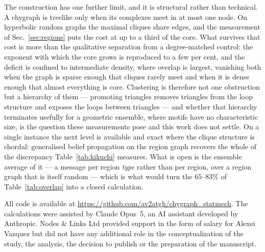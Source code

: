 \documentclass[aps,pre,twocolumn,superscriptaddress,floatfix]{revtex4-2}
\begin{document}
The construction has one further limit, and it is structural rather than
technical. A chygraph is treelike only when its complexes meet in at most one
node. On hyperbolic random graphs the maximal cliques share edges, and the
measurement of Sec.~\ref{sec:regions} puts the cost at up to a third of the
core. What survives that cost is more than the qualitative separation from a
degree-matched control: the exponent with which the core grows is reproduced to
a few per cent, and the deficit is confined to intermediate density, where
overlap is largest, vanishing both when the graph is sparse enough that cliques
rarely meet and when it is dense enough that almost everything is core. Clustering is therefore not one obstruction but
a hierarchy of them --- promoting triangles removes triangles from the loop
structure and exposes the loops between triangles --- and whether that hierarchy
terminates usefully for a geometric ensemble, where motifs have no characteristic
size, is the question these measurements pose and this work does not settle. On
a single instance the next level is available and exact where the clique
structure is chordal: generalised belief propagation on the region graph
recovers the whole of the discrepancy Table~\ref{tab:kikuchi} measures. What is
open is the ensemble average of it --- a message per region \emph{type} rather
than per region, over a region graph that is itself random --- which is what
would turn the $65$--$83\%$ of Table~\ref{tab:overlap} into a closed
calculation.

\begin{acknowledgments}
All code is available at \url{https://github.com/av2atgh/chygraph_statmech}.
The calculations were assisted by Claude Opus~5, an AI assistant developed by
Anthropic. Nodes \& Links Ltd provided support in the form of salary for Alexei
Vazquez but did not have any additional role in the conceptualization of the
study, the analysis, the decision to publish or the preparation of the
manuscript.
\end{acknowledgments}
\end{document}
